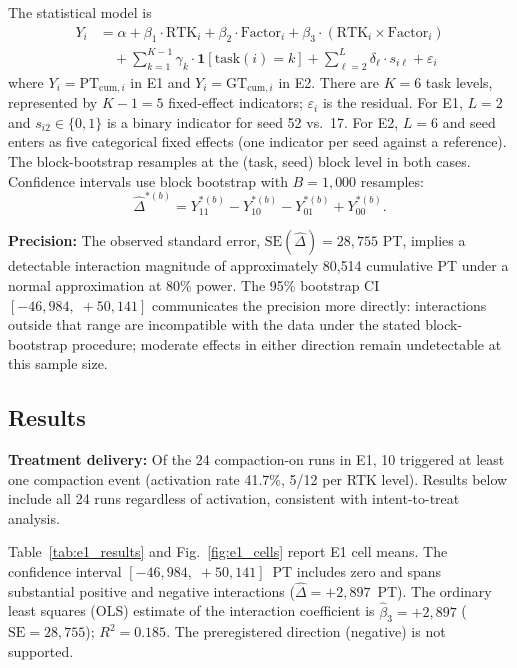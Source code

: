 \documentclass{article}
\begin{document}
The statistical model is
\begin{align}
  Y_i &= \alpha
          + \beta_1 \cdot \mathrm{RTK}_i
          + \beta_2 \cdot \mathrm{Factor}_i
          + \beta_3 \cdot (\mathrm{RTK}_i \times \mathrm{Factor}_i) \nonumber\\
      &\quad + \sum_{k=1}^{K-1} \gamma_k \cdot \mathbf{1}[\mathrm{task}(i)=k]
          + \sum_{\ell=2}^{L} \delta_\ell \cdot s_{i\ell}
          + \varepsilon_i
  \label{eq:ols}
\end{align}
where $Y_i=\mathrm{PT}_{\mathrm{cum},i}$ in E1 and $Y_i=\mathrm{GT}_{\mathrm{cum},i}$ in E2. There are $K=6$ task levels, represented by $K{-}1=5$ fixed-effect indicators; $\varepsilon_i$ is the residual. For E1, $L=2$ and $s_{i2}\in\{0,1\}$ is a binary indicator for seed 52 vs.\ 17. For E2, $L=6$ and seed enters as five categorical fixed effects (one indicator per seed against a reference). The block-bootstrap resamples at the (task, seed) block level in both cases. Confidence intervals use block bootstrap with $B=1{,}000$ resamples:
\begin{equation}
  \hat{\Delta}^{*(b)} = Y_{11}^{*(b)} - Y_{10}^{*(b)} - Y_{01}^{*(b)} + Y_{00}^{*(b)}.
  \label{eq:bootstrap}
\end{equation}

\textbf{Precision:} The observed standard error, $\mathrm{SE}(\hat{\Delta})=28{,}755$ PT, implies a detectable interaction magnitude of approximately 80{,}514 cumulative PT under a normal approximation at 80\% power. The 95\% bootstrap CI $[-46{,}984,\;+50{,}141]$ communicates the precision more directly: interactions outside that range are incompatible with the data under the stated block-bootstrap procedure; moderate effects in either direction remain undetectable at this sample size.

\subsection{Results}

\textbf{Treatment delivery:} Of the 24 compaction-on runs in E1, 10 triggered at least one compaction event (activation rate 41.7\%, 5/12 per RTK level). Results below include all 24 runs regardless of activation, consistent with intent-to-treat analysis.

Table~\ref{tab:e1_results} and Fig.~\ref{fig:e1_cells} report E1 cell means. The confidence interval $[-46{,}984,\;+50{,}141]$~PT includes zero and spans substantial positive and negative interactions ($\hat{\Delta}=+2{,}897$~PT). The ordinary least squares (OLS) estimate of the interaction coefficient is $\hat{\beta}_3=+2{,}897$ ($\mathrm{SE}=28{,}755$); $R^2=0.185$. The preregistered direction (negative) is not supported.
\end{document}
